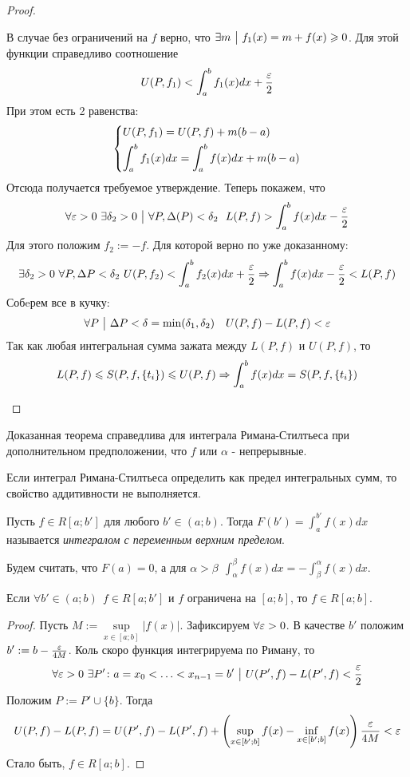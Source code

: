\begin{proof}
\begin{itemize}
	В случае без ограничений на $f$ верно, что $\exists m \ \big|\  f_1(x) = m + f(x) \geqslant 0$. Для этой функции справедливо соотношение
	\[
		U(P, f_1) < \int_a^bf_1(x)dx + \frac{\varepsilon}{2}
	\]
	При этом есть 2 равенства:
	\[
		\left\{\begin{aligned}
			&{U(P, f_1) = U(P, f) + m(b - a)}
			\\
			&{\int_a^b f_1(x)dx = \int_a^b f(x)dx + m(b - a)}
		\end{aligned}\right.
	\]
	Отсюда получается требуемое утверждение. Теперь покажем, что
		\[
			\forall \varepsilon > 0\ \exists \delta_2 > 0 \ \big|\  \forall P, \Delta(P) < \delta_2\ \ L(P, f) >  \int_a^b f(x)dx - \frac{\varepsilon}{2}
		\]
		Для этого положим $f_2 := -f$. Для которой верно по уже доказанному:
		\[
			\exists \delta_2 > 0\ \forall P, \Delta P < \delta_2\ U(P, f_2) < \int_a^bf_2(x)dx + \frac{\varepsilon}{2} \Rightarrow \int_a^bf(x)dx - \frac{\varepsilon}{2} < L(P, f)
		\]
		Собeрем все в кучку:
		\[
			\forall P \ \big|\  \Delta P < \delta = \min(\delta_1, \delta_2) \quad U(P, f) - L(P, f) < \varepsilon
		\]
		Так как любая интегральная сумма зажата между $L(P, f)$ и $U(P, f)$, то
		\[
			L(P, f) \leqslant  S(P, f, \{t_i\}) \leqslant U(P, f) \Rightarrow \int_a^bf(x)dx = S(P, f, \{t_i\})
		\]
	\end{itemize}
\end{proof}

\begin{note}
	Доказанная теорема справедлива для интеграла Римана-Стилтьеса при дополнительном предположении, что $f$ или $\alpha$ - непрерывные.
\end{note}

\begin{note}
	Если интеграл Римана-Стилтьеса определить как предел интегральных сумм, то свойство аддитивности не выполняется.
\end{note}

\begin{definition}
	Пусть $f \in R[a; b']$ для любого $b' \in (a; b)$. Тогда $F(b') = \int_a^{b'} f(x)dx$ называется \textit{интегралом с переменным верхним пределом}.
	
	Будем считать, что $F(a) = 0$, а для $\alpha > \beta\ \ \int_\alpha^\beta f(x)dx = -\int_\beta^\alpha f(x)dx$. 
\end{definition}

\begin{theorem}
	Если $\forall b' \in (a; b)\ \ f \in R[a; b']$ и $f$ ограничена на $[a; b]$, то $f \in R[a; b]$.
\end{theorem}

\begin{proof}
	Пусть $M := \sup\limits_{x \in [a; b]} |f(x)|$. Зафиксируем $\forall \varepsilon > 0$. В качестве $b'$ положим $b' := b - \frac{\varepsilon}{4M}$. Коль скоро функция интегрируема по Риману, то
	\[
		\forall \varepsilon > 0\ \exists P' \colon a = x_0 < \ldots < x_{n - 1} = b' \ \big|\  U(P', f) - L(P', f) < \frac{\varepsilon}{2}
	\]
	Положим $P := P' \cup \{b\}$. Тогда
	\[
		U(P, f) - L(P, f) = U(P', f) - L(P', f) + \left(\sup\limits_{x \in [b'; b]} f(x) - \inf\limits_{x \in [b'; b]} f(x)\right) \frac{\varepsilon}{4M} < \varepsilon
	\]
	Стало быть, $f \in R[a; b]$.
\end{proof}

